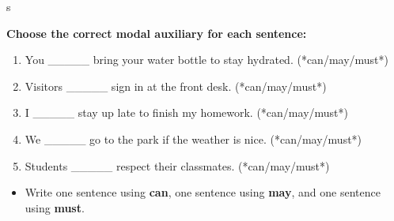 s\documentclass[12pt]{article}
\begin{document}
\begin{tcolorbox}[colframe=black!60, colback=white, 
coltitle=black, colbacktitle=black!15, fonttitle=\bfseries\Large, 
title=Independent Practice, halign title=center, left=10pt, right=10pt, top=10pt, bottom=15pt]
\textbf{Choose the correct modal auxiliary for each sentence:}
\begin{enumerate}[itemsep=3em]
    \item You \_\_\_\_\_ bring your water bottle to stay hydrated. (*can/may/must*)
    \item Visitors \_\_\_\_\_ sign in at the front desk. (*can/may/must*)
    \item I \_\_\_\_\_ stay up late to finish my homework. (*can/may/must*)
    \item We \_\_\_\_\_ go to the park if the weather is nice. (*can/may/must*)
    \item Students \_\_\_\_\_ respect their classmates. (*can/may/must*)
\end{enumerate}
\end{tcolorbox}

\vspace{1em}

\begin{tcolorbox}[colframe=black!60, colback=white, 
coltitle=black, colbacktitle=black!15, fonttitle=\bfseries\Large, 
title=Exit Ticket, halign title=center, left=10pt, right=10pt, top=10pt, bottom=15pt]

\begin{itemize}
    \item Write one sentence using \textbf{can}, one sentence using \textbf{may}, and one sentence using \textbf{must}.

\vspace{2em}

     \underline{\hspace{14.6cm}}  
    \\[0.8cm] \underline{\hspace{14.6cm}}  
    \\[0.8cm] \underline{\hspace{14.6cm}}

\end{itemize}
\end{tcolorbox}
\end{document}
